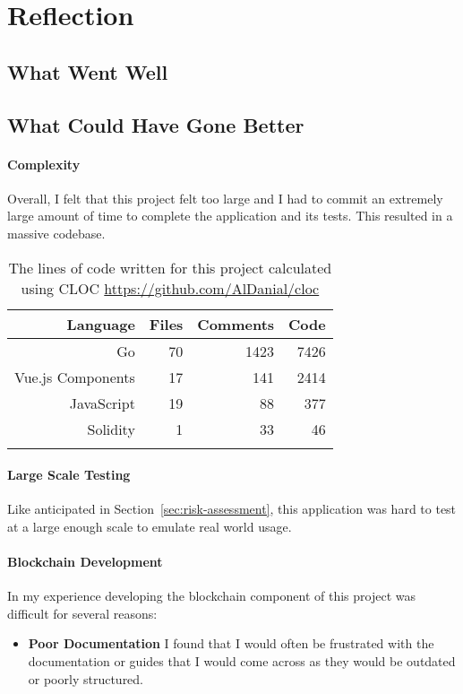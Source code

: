 \section{Reflection}

\subsection{What Went Well}



\subsection{What Could Have Gone Better}

\paragraph*{Complexity}
Overall, I felt that this project felt too large and I had to commit an extremely large amount of time to complete the application and its tests. This resulted in a massive codebase.

\begin{longtable}{ | r | r | r | r | }
  \hline
  \textbf{Language} & \textbf{Files} & \textbf{Comments} & \textbf{Code}
  \\\hline
  Go
  & 70
  & 1423
  & 7426
  \\\hline
  Vue.js Components
  & 17
  & 141
  & 2414
  \\\hline
  JavaScript
  & 19
  & 88
  & 377
  \\\hline
  Solidity
  & 1
  & 33
  & 46
  \\\hline
  \caption{The lines of code written for this project calculated using CLOC \url{https://github.com/AlDanial/cloc}}
\end{longtable}

\paragraph*{Large Scale Testing}
Like anticipated in Section~\ref{sec:risk-assessment}, this application was hard to test at a large enough scale to emulate real world usage.

\paragraph*{Blockchain Development}
In my experience developing the blockchain component of this project was difficult for several reasons:

\begin{itemize}
  \item \textbf{Poor Documentation} I found that I would often be frustrated with the documentation or guides that I would come across as they would be outdated or poorly structured.
   
\end{itemize}